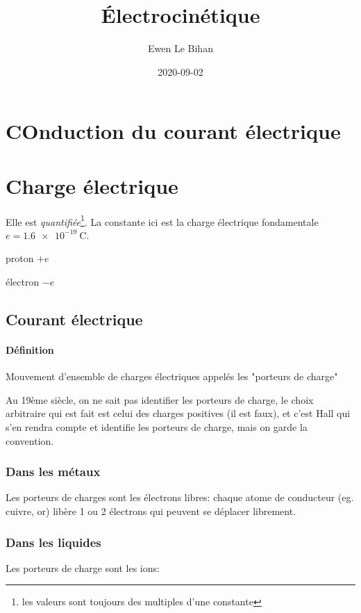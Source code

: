 \documentclass{article}
\title{Électrocinétique}
\date{2020-09-02}
\author{Ewen Le Bihan}
\newenvironment{definition}{\begin{description}[leftmargin=!,labelwidth=\widthof{\bfseries Lorem ipsum dolor}]}{\end{description}}
\begin{document}
\maketitle

\section{COnduction du courant électrique}
\section{Charge électrique}
Elle est \emph{quantifiée}\footnote{les valeurs sont toujours des multiples d'une constante}. La constante ici est la charge électrique fondamentale $e = \SI{1.6e-19}{\coulomb}$.

\begin{definition}
	\item[proton] $+e$
	\item[électron] $-e$
\end{definition}

\subsection{Courant électrique}
\paragraph{Définition} Mouvement d'ensemble de charges électriques appelés les "porteurs de charge"


Au 19ème siècle, on ne sait pas identifier les porteurs de charge, le choix arbitraire qui est fait est celui des charges positives (il est faux), et c'est Hall qui s'en rendra compte et identifie les porteurs de charge, mais on garde la convention.

\subsubsection{Dans les métaux}
Les porteurs de charges sont les électrons libres: chaque atome de conducteur (eg. cuivre, or) libère 1 ou 2 électrons qui peuvent se déplacer librement.

\subsubsection{Dans les liquides}
Les porteurs de charge sont les ions:
\end{document}
